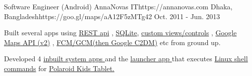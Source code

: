 \begin{workentries}
  \workentry
    {Software Engineer (Android)} %
    {AnnaNovas IT}{https://annanovas.com} %
    {Dhaka, Bangladesh}{https://goo.gl/maps/aA12F5zMTg42} %
    {Oct. 2011 - Jun. 2013} %
    {
      \begin{workitems} %
        \item {Built several apps using 
        {\href{https://en.wikipedia.org/wiki/Representational_state_transfer}{REST api}}
        , 
        {\href{https://www.sqlite.org/about.html}{SQLite}}, 
        {\href{https://developer.android.com/guide/topics/ui/custom-components}{custom views/controls}}
        , 
        {\href{https://developer.android.com/guide/topics/ui/custom-components}{Google Maps API (v2)}}
        , 
        {\href{https://firebase.google.com/docs/cloud-messaging/}{FCM/GCM(then Google C2DM)}} etc from ground up.}
        \item {Developed 4 
        {\href{https://www.hexnode.com/mobile-device-management/help/what-are-system-apps/}{inbuilt system apps }}
        and the 
        {\href{https://www.cnet.com/how-to/everything-you-need-to-know-about-android-launchers/}{launcher app }}
        that executes 
        {\href{https://forum.xda-developers.com/showthread.php?t=1694251}{Linux shell commands}} 
        for }
        {\href{https://www.polaroid.com/kids-tablet-2}{Polaroid Kids Tablet.}}
      \end{workitems}
    }

\end{workentries}
